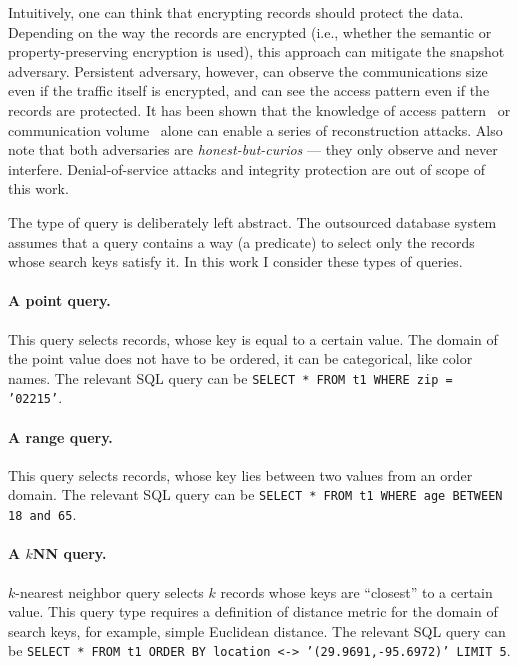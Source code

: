 		Intuitively, one can think that encrypting records should protect the data.
		Depending on the way the records are encrypted (i.e., whether the semantic or property-preserving encryption is used), this approach can mitigate the snapshot adversary.
		Persistent adversary, however, can observe the communications size even if the traffic itself is encrypted, and can see the access pattern even if the records are protected.
		It has been shown that the knowledge of access pattern~\cite{multidimensional-range-queries, inference-attack-islam-14, leakage-abuse-attacks-cash-15, inference-attacks-naveed-15, generic-attacks-kellaris, attacks-tao-of-inference, grubbs-attacks, access-pattern-disclosure, attacks-improved-reconstruction} or communication volume~\cite{generic-attacks-kellaris, state-of-uniform, attacks-improved-reconstruction, pump-volume-attacks, volume-range-attacks} alone can enable a series of reconstruction attacks.
		Also note that both adversaries are \emph{honest-but-curios} --- they only observe and never interfere.
		Denial-of-service attacks and integrity protection are out of scope of this work.

		The type of query \query{} is deliberately left abstract.
		The outsourced database system assumes that a query contains a way (a predicate) to select only the records whose search keys satisfy it.
		In this work I consider these types of queries.

		\paragraph*{A point query.}
			This query selects records, whose key is equal to a certain value.
			The domain of the point value does not have to be ordered, it can be categorical, like color names.
			The relevant SQL query can be \texttt{SELECT * FROM t1 WHERE zip = '02215'}.

		\paragraph*{A range query.}
			This query selects records, whose key lies between two values from an order domain.
			The relevant SQL query can be \texttt{SELECT * FROM t1 WHERE age BETWEEN 18 and 65}.

		\paragraph*{A $k$NN query.}
			$k$-nearest neighbor query selects $k$ records whose keys are ``closest'' to a certain value.
			This query type requires a definition of distance metric for the domain of search keys, for example, simple Euclidean distance.
			The relevant SQL query can be \texttt{SELECT * FROM t1 ORDER BY location <-> '(29.9691,-95.6972)' LIMIT 5}. %

